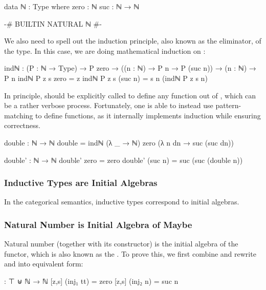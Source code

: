 \begin{code}
data ℕ : Type where
  zero : ℕ
  suc : ℕ → ℕ
\end{code}

\begin{code}[hide]
{-# BUILTIN NATURAL ℕ #-}
\end{code}

 We also need to spell out the induction principle, also known as the eliminator, of the type. In this case, we are doing mathematical induction on :

\begin{code}
indℕ : (P : ℕ → Type)
  → P zero
  → ((n : ℕ) → P n → P (suc n))
  → (n : ℕ) → P n
indℕ P z s zero = z
indℕ P z s (suc n) = s n (indℕ P z s n)
\end{code}

In principle,  should be explicitly called to define any function out of , which can be a rather verbose process. Fortunately, one is able to instead use pattern-matching to define functions, as it internally implements induction while ensuring correctness.

\begin{code}
double : ℕ → ℕ
double = indℕ (λ _ → ℕ) zero (λ n dn → suc (suc dn))

double' : ℕ → ℕ
double' zero = zero
double' (suc n) = suc (suc (double n))
\end{code}

\subsubsection*{Inductive Types are Initial Algebras}

In the categorical semantics, inductive types correspond to initial algebras.

\subsubsection*{Natural Number is Initial Algebra of Maybe}

Natural number (together with its constructor) is the initial algebra of the  functor, which is also known as the . To prove this, we first combine and rewrite  and  into equivalent form:

\begin{code}
[z,s] : ⊤ ⊎ ℕ → ℕ
[z,s] (inj₁ tt) = zero
[z,s] (inj₂ n) = suc n
\end{code}

